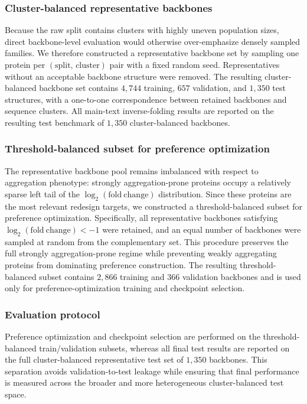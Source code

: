 \documentclass[pdflatex,sn-mathphys-num]{sn-jnl}%
\theoremstyle{thmstyleone}%
\theoremstyle{thmstyletwo}%
\theoremstyle{thmstylethree}%
\begin{document}
\subsubsection*{Cluster-balanced representative backbones}

Because the raw split contains clusters with highly uneven population sizes, direct backbone-level evaluation would otherwise over-emphasize densely sampled families. We therefore constructed a representative backbone set by sampling one protein per $(\text{split},\,\text{cluster})$ pair with a fixed random seed. Representatives without an acceptable backbone structure were removed. The resulting cluster-balanced backbone set contains $4{,}744$ training, $657$ validation, and $1{,}350$ test structures, with a one-to-one correspondence between retained backbones and sequence clusters. All main-text inverse-folding results are reported on the resulting test benchmark of $1{,}350$ cluster-balanced backbones.

\subsubsection*{Threshold-balanced subset for preference optimization}

The representative backbone pool remains imbalanced with respect to aggregation phenotype: strongly aggregation-prone proteins occupy a relatively sparse left tail of the $\log_2(\mathrm{fold\ change})$ distribution. Since these proteins are the most relevant redesign targets, we constructed a threshold-balanced subset for preference optimization. Specifically, all representative backbones satisfying $\log_2(\mathrm{fold\ change}) < -1$ were retained, and an equal number of backbones were sampled at random from the complementary set. This procedure preserves the full strongly aggregation-prone regime while preventing weakly aggregating proteins from dominating preference construction. The resulting threshold-balanced subset contains $2{,}866$ training and $366$ validation backbones and is used only for preference-optimization training and checkpoint selection.

\subsubsection*{Evaluation protocol}

Preference optimization and checkpoint selection are performed on the threshold-balanced train/validation subsets, whereas all final test results are reported on the full cluster-balanced representative test set of $1{,}350$ backbones. This separation avoids validation-to-test leakage while ensuring that final performance is measured across the broader and more heterogeneous cluster-balanced test space.
\end{document}

